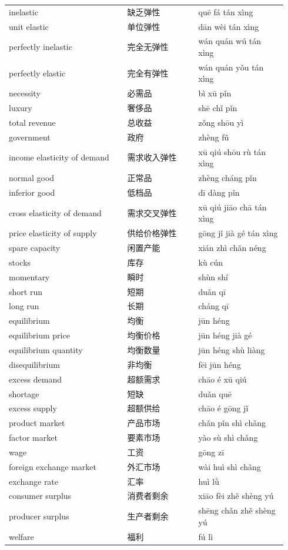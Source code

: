 \documentclass[11pt]{article}
\begin{document}
\begin{longtable}{@{}p{0.40\linewidth}p{0.24\linewidth}p{0.30\linewidth}@{}}
inelastic & 缺乏弹性 & quē fá tán xìng \\
unit elastic & 单位弹性 & dān wèi tán xìng \\
perfectly inelastic & 完全无弹性 & wán quán wú tán xìng \\
perfectly elastic & 完全有弹性 & wán quán yǒu tán xìng \\
necessity & 必需品 & bì xū pǐn \\
luxury & 奢侈品 & shē chǐ pǐn \\
total revenue & 总收益 & zǒng shōu yì \\
government & 政府 & zhèng fǔ \\
income elasticity of demand & 需求收入弹性 & xū qiú shōu rù tán xìng \\
normal good & 正常品 & zhèng cháng pǐn \\
inferior good & 低档品 & dī dàng pǐn \\
cross elasticity of demand & 需求交叉弹性 & xū qiú jiāo chā tán xìng \\
price elasticity of supply & 供给价格弹性 & gōng jǐ jià gé tán xìng \\
spare capacity & 闲置产能 & xián zhì chǎn néng \\
stocks & 库存 & kù cún \\
momentary & 瞬时 & shùn shí \\
short run & 短期 & duǎn qī \\
long run & 长期 & cháng qī \\
equilibrium & 均衡 & jūn héng \\
equilibrium price & 均衡价格 & jūn héng jià gé \\
equilibrium quantity & 均衡数量 & jūn héng shù liàng \\
disequilibrium & 非均衡 & fēi jūn héng \\
excess demand & 超额需求 & chāo é xū qiú \\
shortage & 短缺 & duǎn quē \\
excess supply & 超额供给 & chāo é gōng jǐ \\
product market & 产品市场 & chǎn pǐn shì chǎng \\
factor market & 要素市场 & yào sù shì chǎng \\
wage & 工资 & gōng zī \\
foreign exchange market & 外汇市场 & wài huì shì chǎng \\
exchange rate & 汇率 & huì lǜ \\
consumer surplus & 消费者剩余 & xiāo fèi zhě shèng yú \\
producer surplus & 生产者剩余 & shēng chǎn zhě shèng yú \\
welfare & 福利 & fú lì \\
\end{longtable}
\end{document}
